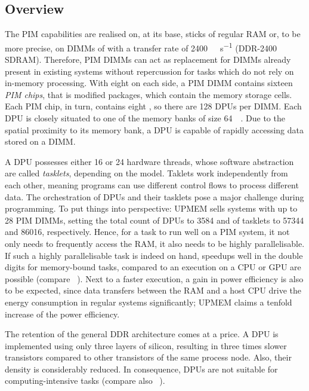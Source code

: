 \subsection{Overview}
\label{sec:prereq:arch:overview}

The \ac{PIM} capabilities are realised on, at its base, sticks of regular \ac{RAM} or, to be more precise, on \acp{DIMM} of \label{acro:DDR} \label{acro:SDRAM} with a transfer rate of \qty{2400}{\mega\transfer\per\second} (\acs{DDR}-2400 \acs{SDRAM}).
Therefore, \ac{PIM} \acp{DIMM} can act as replacement for \acp{DIMM} already present in existing systems without repercussion for tasks which do not rely on in-memory processing.
With eight on each side, a \ac{PIM} \ac{DIMM} contains sixteen \emph{PIM chips}, that is modified  packages, which contain the memory storage cells.
Each \ac{PIM} chip, in turn, contains eight , so there are 128 \acp{DPU} per \ac{DIMM}.
Each \ac{DPU} is closely situated to one of the memory banks of size \qty{64}{\mebi\byte}.
Due to the spatial proximity to its memory bank, a \ac{DPU} is capable of rapidly accessing data stored on a \ac{DIMM}.

A \ac{DPU} possesses either 16 or 24 hardware threads, whose software abstraction are called \emph{tasklets}, depending on the model.
Taklets work independently from each other, meaning programs can use different control flows to process different data.
The orchestration of \acp{DPU} and their tasklets pose a major challenge during programming.
To put things into perspective:
UPMEM sells systems with up to 28 \ac{PIM} \acp{DIMM}, setting the total count of \acp{DPU} to \num{3584} and of tasklets to \num{57344} and \num{86016}, respectively.
Hence, for a task to run well on a \ac{PIM} system, it not only needs to frequently access the \ac{RAM}, it also needs to be highly parallelisable.
If such a highly parallelisable task is indeed on hand, speedups well in the double digits for memory-bound tasks, compared to an execution on a \ac{CPU} or \ac{GPU} are possible (compare \citeauthor{mutlu2022Benchmarking}~\cite{mutlu2022Benchmarking}).
Next to a faster execution, a gain in power efficiency is also to be expected, since data transfers between the \ac{RAM} and a host \ac{CPU} drive the energy consumption in regular systems significantly;
UPMEM claims a tenfold increase of the power efficiency.

The retention of the general \ac{DDR} architecture comes at a price.
A \ac{DPU} is implemented using only three layers of silicon, resulting in three times slower transistors compared to other transistors of the same process node.
Also, their density is considerably reduced.
In consequence, \acp{DPU} are not suitable for computing-intensive tasks (compare also \citeauthor{mutlu2022Benchmarking}~\cite{mutlu2022Benchmarking}).
